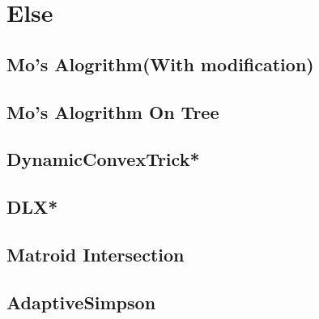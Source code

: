 \section{Else}
\subsection{Mo's Alogrithm(With modification)}

\subsection{Mo's Alogrithm On Tree}

\subsection{DynamicConvexTrick*} %

\subsection{DLX*} %

\subsection{Matroid Intersection}

\subsection{AdaptiveSimpson}

